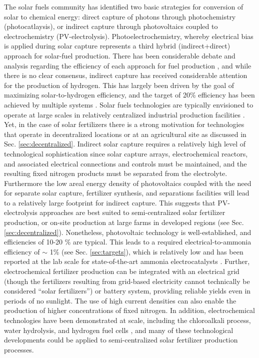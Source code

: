 The solar fuels community has identified two basic strategies for conversion of solar to chemical energy: direct capture of photons through photochemistry (photocatlaysis), or indirect capture through photovoltaics coupled to electrochemistry (PV-electrolysis)\cite{McDaniel_2010,Highfield_2015}. Photoelectrochemistry, whereby electrical bias is applied during solar capture represents a third hybrid (indirect+direct) approach for solar-fuel production. There has been considerable debate and analysis regarding the efficiency of each approach for fuel production \cite{Montoya_2017,Daviseaas9793,Lewis_2016,Herron_2015}, and while there is no clear consensus, indirect capture has received considerable attention for the production of hydrogen. This has largely been driven by the goal of maximizing solar-to-hydrogen efficiency, and the target of 20\% efficiency has been achieved by multiple systems \cite{Nakamura_2015,Jia_2016}. Solar fuels technologies are typically envisioned to operate at large scales in relatively centralized industrial production facilities \cite{Shaner_2016}. Yet, in the case of solar fertilizers there is a strong motivation for technologies that operate in decentralized locations or at an agricultural site as discussed in Sec. \ref{sec:decentralized}. Indirect solar capture requires a relatively high level of technological sophistication since solar capture arrays, electrochemical reactors, and associated electrical connections and controls must be maintained, and the resulting fixed nitrogen products must be separated from the electrolyte. Furthermore the low areal energy density of photovoltaics \cite{MacKay_2013} coupled with the need for separate solar capture, fertilizer synthesis, and separations facilities will lead to a relatively large footprint for indirect capture. This suggests that PV-electrolysis approaches are best suited to semi-centralized solar fertilizer production, or on-site production at large farms in developed regions (see Sec. \ref{sec:decentralized}). Nonetheless, photovoltaic technology is well-established, and efficiencies of 10-20 \% are typical. This leads to a required electrical-to-ammonia efficiency of $\sim$ 1\% (see Sec. \ref{sec:targets}), which is relatively low and has been reported at the lab scale for state-of-the-art ammonia electrocatalysts \cite{Liu2018,Qiu_2018,Song_2018,Zhang_2018,Luo_2018}. Further, electrochemical fertilizer production can be integrated with an electrical grid (though the fertilizers resulting from grid-based electricity cannot technically be considered ``solar fertilizers'') or battery system, providing reliable yields even in periods of no sunlight. The use of high current densities can also enable the production of higher concentrations of fixed nitrogen. In addition, electrochemical technologies have been demonstrated at scale, including the chloroalkali process, water hydrolysis, and hydrogen fuel cells  \cite{Burney1993,LEROY_1983,fuel_cells_2016}, and many of these technological developments could be applied to semi-centralized solar fertilizer production processes.

